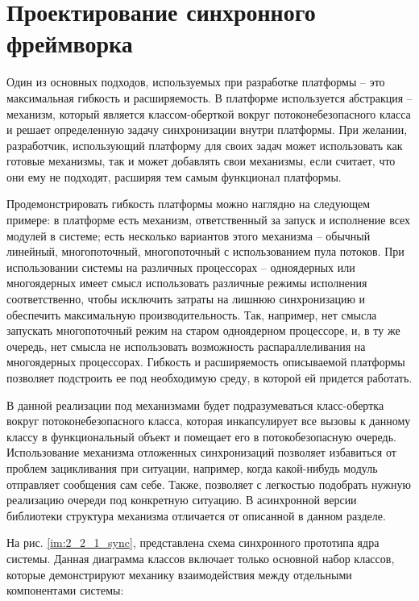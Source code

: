 \section{Проектирование синхронного фреймворка}

Один из основных подходов, используемых при разработке платформы 
– это максимальная гибкость и расширяемость. В платформе 
используется абстракция – механизм, который является 
классом-оберткой вокруг потоконебезопасного класса и решает 
определенную задачу синхронизации внутри платформы. При желании, 
разработчик, использующий платформу для своих задач  может 
использовать как готовые механизмы, так и может добавлять свои 
механизмы, если считает, что они ему не подходят, расширяя тем 
самым функционал платформы.

Продемонстрировать гибкость платформы можно наглядно на 
следующем примере: в платформе есть механизм, ответственный за 
запуск и исполнение всех модулей в системе; есть несколько 
вариантов этого механизма – обычный линейный, многопоточный, 
многопоточный с использованием пула потоков. При использовании 
системы на различных процессорах – одноядерных или многоядерных 
имеет смысл использовать различные режимы исполнения 
соответственно, чтобы исключить затраты на лишнюю синхронизацию 
и обеспечить максимальную производительность. Так, например, нет 
смысла запускать многопоточный режим на старом одноядерном 
процессоре, и, в ту же очередь, нет смысла не использовать 
возможность распараллеливания на многоядерных процессорах. 
Гибкость и расширяемость описываемой платформы позволяет 
подстроить ее под необходимую среду, в которой ей придется 
работать.

В данной реализации под механизмами будет подразумеваться класс-обертка вокруг потоконебезопасного класса, которая инкапсулирует все вызовы к данному классу в функциональный объект и помещает его в потокобезопасную очередь. Использование механизма отложенных синхронизаций позволяет избавиться от проблем зацикливания при ситуации, например, когда какой-нибудь модуль отправляет сообщения сам себе. Также, позволяет с легкостью подобрать нужную реализацию очереди под конкретную ситуацию. В асинхронной версии библиотеки структура механизма отличается от описанной в данном разделе.

На рис. \ref{im:2_2_1_sync}, представлена схема синхронного прототипа ядра системы. Данная диаграмма классов включает только основной набор классов, которые демонстрируют механику взаимодействия между отдельными компонентами системы:


